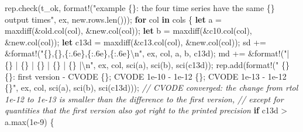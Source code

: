 \documentclass[
  10pt,
]{article}
\newenvironment{Shaded}{}{}
\newcommand{\CommentTok}[1]{\textcolor[rgb]{0.38,0.63,0.69}{\textit{#1}}}
\newcommand{\ControlFlowTok}[1]{\textcolor[rgb]{0.00,0.44,0.13}{\textbf{#1}}}
\newcommand{\DecValTok}[1]{\textcolor[rgb]{0.25,0.63,0.44}{#1}}
\newcommand{\KeywordTok}[1]{\textcolor[rgb]{0.00,0.44,0.13}{\textbf{#1}}}
\newcommand{\NormalTok}[1]{#1}
\newcommand{\OperatorTok}[1]{\textcolor[rgb]{0.40,0.40,0.40}{#1}}
\newcommand{\PreprocessorTok}[1]{\textcolor[rgb]{0.74,0.48,0.00}{#1}}
\newcommand{\SpecialCharTok}[1]{\textcolor[rgb]{0.25,0.44,0.63}{#1}}
\newcommand{\StringTok}[1]{\textcolor[rgb]{0.25,0.44,0.63}{#1}}
\begin{document}
\begin{Shaded}
\begin{Highlighting}[]
\NormalTok{        rep}\OperatorTok{.}\NormalTok{check(t\_ok}\OperatorTok{,} \PreprocessorTok{format!}\NormalTok{(}\StringTok{"example \{\}: the four time series have the same \{\} output times"}\OperatorTok{,}\NormalTok{ ex}\OperatorTok{,}\NormalTok{ new}\OperatorTok{.}\NormalTok{rows}\OperatorTok{.}\NormalTok{len()))}\OperatorTok{;}
        \ControlFlowTok{for}\NormalTok{ col }\KeywordTok{in}\NormalTok{ cols }\OperatorTok{\{}
            \KeywordTok{let}\NormalTok{ a }\OperatorTok{=}\NormalTok{ maxdiff(}\OperatorTok{\&}\NormalTok{old}\OperatorTok{.}\NormalTok{col(col)}\OperatorTok{,} \OperatorTok{\&}\NormalTok{new}\OperatorTok{.}\NormalTok{col(col))}\OperatorTok{;}
            \KeywordTok{let}\NormalTok{ b }\OperatorTok{=}\NormalTok{ maxdiff(}\OperatorTok{\&}\NormalTok{c10}\OperatorTok{.}\NormalTok{col(col)}\OperatorTok{,} \OperatorTok{\&}\NormalTok{new}\OperatorTok{.}\NormalTok{col(col))}\OperatorTok{;}
            \KeywordTok{let}\NormalTok{ c13d }\OperatorTok{=}\NormalTok{ maxdiff(}\OperatorTok{\&}\NormalTok{c13}\OperatorTok{.}\NormalTok{col(col)}\OperatorTok{,} \OperatorTok{\&}\NormalTok{new}\OperatorTok{.}\NormalTok{col(col))}\OperatorTok{;}
\NormalTok{            sd }\OperatorTok{+=} \OperatorTok{\&}\PreprocessorTok{format!}\NormalTok{(}\StringTok{"\{\},\{\},\{:.6e\},\{:.6e\},\{:.6e\}}\SpecialCharTok{\textbackslash{}n}\StringTok{"}\OperatorTok{,}\NormalTok{ ex}\OperatorTok{,}\NormalTok{ col}\OperatorTok{,}\NormalTok{ a}\OperatorTok{,}\NormalTok{ b}\OperatorTok{,}\NormalTok{ c13d)}\OperatorTok{;}
\NormalTok{            md }\OperatorTok{+=} \OperatorTok{\&}\PreprocessorTok{format!}\NormalTok{(}\StringTok{"| \{\} | \textasciigrave{}\{\}\textasciigrave{} | \{\} | \{\} | \{\} |}\SpecialCharTok{\textbackslash{}n}\StringTok{"}\OperatorTok{,}\NormalTok{ ex}\OperatorTok{,}\NormalTok{ col}\OperatorTok{,}\NormalTok{ sci(a)}\OperatorTok{,}\NormalTok{ sci(b)}\OperatorTok{,}\NormalTok{ sci(c13d))}\OperatorTok{;}
\NormalTok{            rep}\OperatorTok{.}\NormalTok{add(}\PreprocessorTok{format!}\NormalTok{(}\StringTok{"  \{\} \{\}: first version {-} CVODE \{\}; CVODE 1e{-}10 {-} 1e{-}12 \{\}; CVODE 1e{-}13 {-} 1e{-}12 \{\}"}\OperatorTok{,}\NormalTok{ ex}\OperatorTok{,}\NormalTok{ col}\OperatorTok{,}\NormalTok{ sci(a)}\OperatorTok{,}\NormalTok{ sci(b)}\OperatorTok{,}\NormalTok{ sci(c13d)))}\OperatorTok{;}
            \CommentTok{// CVODE converged: the change from rtol 1e{-}12 to 1e{-}13 is smaller than the difference to the first version,}
            \CommentTok{// except for quantities that the first version also got right to the printed precision}
            \ControlFlowTok{if}\NormalTok{ c13d }\OperatorTok{\textgreater{}}\NormalTok{ a}\OperatorTok{.}\NormalTok{max(}\DecValTok{1e{-}9}\NormalTok{) }\OperatorTok{\{}

\end{Highlighting}
\end{Shaded}
\end{document}
